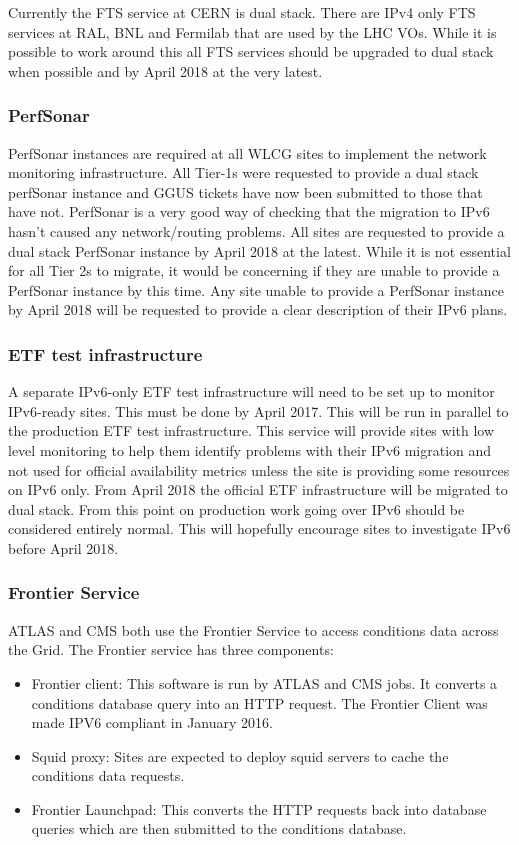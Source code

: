 \documentclass[11pt]{article}
\begin{document}
Currently the FTS service at CERN is dual stack.  There are IPv4 only FTS services at RAL, BNL and Fermilab that are used by the LHC VOs.  While it is possible to work around this all FTS services should be upgraded to dual stack when possible and by April 2018 at the very latest. 

\subsubsection{PerfSonar}
PerfSonar instances are required at all WLCG sites to implement the network monitoring infrastructure. All Tier-1s were requested to provide a dual stack perfSonar instance and GGUS tickets have now been submitted to those that have not.  PerfSonar is a very good way of checking that the migration to IPv6 hasn't caused any network/routing problems.  All sites are requested to provide a dual stack PerfSonar instance by April 2018 at the latest. While it is not essential for all Tier 2s to migrate, it would be concerning if they are unable to provide a PerfSonar instance by this time.  Any site unable to provide a PerfSonar instance by April 2018 will be requested to provide a clear description of their IPv6 plans.

\subsubsection{ETF test infrastructure}
A separate IPv6-only ETF test infrastructure will need to be set up to monitor IPv6-ready sites.   This must be done by April 2017.  This will be run in parallel to the production ETF test infrastructure.  This service will provide sites with low level monitoring to help them identify problems with their IPv6 migration and not used for official availability metrics unless the site is providing some resources on IPv6 only.  From April 2018 the official ETF infrastructure will be migrated to dual stack.  From this point on production work going over IPv6 should be considered entirely normal.  This will hopefully encourage sites to investigate IPv6 before April 2018.  

\subsubsection{Frontier Service}
ATLAS and CMS both use the Frontier Service\cite{Frontier} to access conditions data across the Grid. The Frontier service has three components:
\begin{itemize}
\item Frontier client: This software is run by ATLAS and CMS jobs. It converts a conditions database query into an HTTP request. The Frontier Client was made IPV6 compliant in January 2016.
\item Squid proxy: Sites are expected to deploy squid servers to cache the conditions data requests.
\item Frontier Launchpad: This converts the HTTP requests back into database queries which are then submitted to the conditions database.
\end{itemize}
\end{document}
